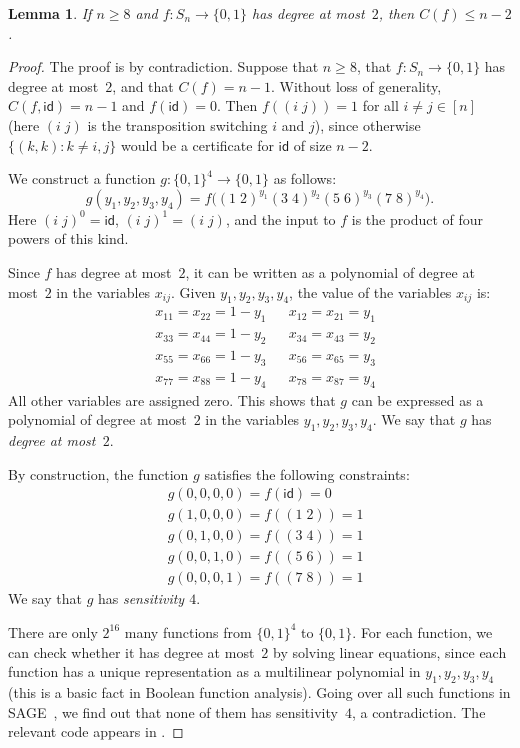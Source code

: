 \documentclass{article}
\newtheorem{lemma}[theorem]{Lemma}
\theoremstyle{definition}
\providecommand{\id}{\mathsf{id}}
\begin{document}
\begin{lemma} \label{lem:C-bound-sym}
If $n \geq 8$ and $f\colon S_n \to \{0,1\}$ has degree at most~$2$, then $C(f) \leq n-2$.
\end{lemma}
\begin{proof}
The proof is by contradiction. Suppose that $n \geq 8$, that $f\colon S_n \to \{0,1\}$ has degree at most~$2$, and that $C(f) = n-1$. Without loss of generality, $C(f,\id) = n-1$ and $f(\id) = 0$. Then $f((i\;j)) = 1$  for all $i \neq j \in [n]$ (here $(i\;j)$ is the transposition switching $i$ and $j$), since otherwise $\{(k,k) : k \neq i,j\}$ would be a certificate for $\id$ of size $n-2$.

We construct a function $g\colon \{0,1\}^4 \to \{0,1\}$ as follows:
\[
 g(y_1,y_2,y_3,y_4) = f\bigl((1\;2)^{y_1} (3\;4)^{y_2} (5\;6)^{y_3} (7\;8)^{y_4}\bigr).
\]
Here $(i\;j)^0 = \id$, $(i\;j)^1 = (i\;j)$, and the input to $f$ is the product of four powers of this kind.

Since $f$ has degree at most~$2$, it can be written as a polynomial of degree at most~$2$ in the variables $x_{ij}$. Given $y_1,y_2,y_3,y_4$, the value of the variables $x_{ij}$ is:
\begin{align*}
    &x_{11} = x_{22} = 1-y_1 && x_{12} = x_{21} = y_1 \\
    &x_{33} = x_{44} = 1-y_2 && x_{34} = x_{43} = y_2 \\
    &x_{55} = x_{66} = 1-y_3 && x_{56} = x_{65} = y_3 \\
    &x_{77} = x_{88} = 1-y_4 && x_{78} = x_{87} = y_4 
\end{align*}
All other variables are assigned zero. This shows that $g$ can be expressed as a polynomial of degree at most~$2$ in the variables $y_1,y_2,y_3,y_4$. We say that $g$ has \emph{degree at most~$2$}. 

By construction, the function $g$ satisfies the following constraints:
\begin{align*}
    &g(0,0,0,0) = f(\id) = 0 \\
    &g(1,0,0,0) = f((1\;2)) = 1 \\
    &g(0,1,0,0) = f((3\;4)) = 1 \\
    &g(0,0,1,0) = f((5\;6)) = 1 \\
    &g(0,0,0,1) = f((7\;8)) = 1 
\end{align*}
We say that $g$ has \emph{sensitivity $4$}.

There are only $2^{16}$ many functions from $\{0,1\}^4$ to $\{0,1\}$. For each function, we can check whether it has degree at most~$2$ by solving linear equations, since each function has a unique representation as a multilinear polynomial in $y_1,y_2,y_3,y_4$ (this is a basic fact in Boolean function analysis). Going over all such functions in SAGE~\cite{sagemath}, we find out that none of them has sensitivity~$4$, a contradiction. The relevant code appears in . 
\end{proof}
\end{document}
